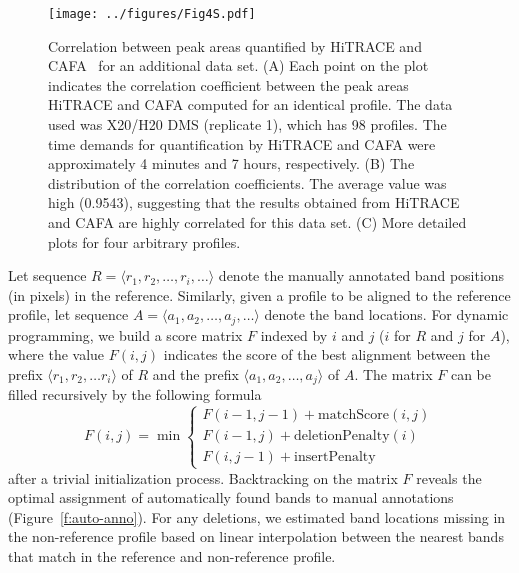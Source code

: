 \documentclass[letter]{bioinfo}
\begin{document}


\begin{figure}
\centering
    \texttt{[image: ../figures/Fig4S.pdf]}
\caption{Correlation between peak areas quantified by HiTRACE and CAFA~\citep{mitra2008high} for an additional data set. (A) Each point on the plot indicates the correlation coefficient between the peak areas HiTRACE and CAFA computed for an identical profile. The data used was X20/H20 DMS (replicate 1), which has 98 profiles. The time demands for quantification by HiTRACE and CAFA were approximately 4 minutes and 7 hours, respectively. (B) The distribution of the correlation coefficients. The average value was high (0.9543), suggesting that the results obtained from HiTRACE and CAFA are highly correlated for this data set. (C) More detailed plots for four arbitrary profiles. %
}
\label{f:corr-cafa-hitrace}
\end{figure}
Let sequence $R=\langle r_1, r_2,\ldots,r_i,\ldots \rangle$ denote the manually annotated band positions (in pixels) in the reference. Similarly, given a profile to be aligned to the reference profile, let sequence $A=\langle a_1, a_2,\ldots,a_j,\ldots \rangle$ denote the band locations. For dynamic programming, we build a score matrix $F$ indexed by $i$ and $j$ ($i$ for $R$ and $j$ for $A$), where the value $F(i,j)$ indicates the score of the best alignment between the prefix $\langle r_1,r_2,\ldots r_i\rangle$ of $R$ and the prefix $\langle a_1,a_2,\ldots, a_j\rangle$ of $A$. The matrix $F$ can be filled recursively by the following formula
%
\begin{equation}
F(i,j) = \min
    \begin{cases}
        F(i - 1, j - 1) + \mathrm{matchScore}(i,j)\\
        F(i - 1, j ) + \mathrm{deletionPenalty}(i)\\
        F(i, j - 1) + \mathrm{insertPenalty}
    \end{cases}
\end{equation}
after a trivial initialization process. Backtracking on the matrix $F$ reveals the optimal assignment of automatically found bands to manual annotations (Figure~\ref{f:auto-anno}). For any deletions, we estimated band locations missing in the non-reference profile based on linear interpolation between the nearest bands that match in the reference and non-reference profile.
\end{document}
